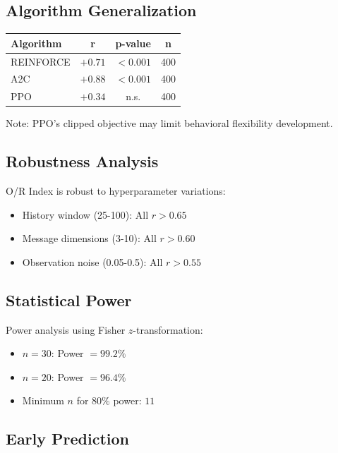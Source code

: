 \documentclass[twoside]{article}
\begin{document}
\subsection{Algorithm Generalization}

\begin{center}
\begin{tabular}{lccc}
\toprule
\textbf{Algorithm} & \textbf{r} & \textbf{p-value} & \textbf{n} \\
\midrule
REINFORCE & $+0.71$ & $< 0.001$ & 400 \\
A2C & $+0.88$ & $< 0.001$ & 400 \\
PPO & $+0.34$ & n.s. & 400 \\
\bottomrule
\end{tabular}
\end{center}

Note: PPO's clipped objective may limit behavioral flexibility development.

\subsection{Robustness Analysis}

O/R Index is robust to hyperparameter variations:

\begin{itemize}
    \item History window (25-100): All $r > 0.65$
    \item Message dimensions (3-10): All $r > 0.60$
    \item Observation noise (0.05-0.5): All $r > 0.55$
\end{itemize}

\subsection{Statistical Power}

Power analysis using Fisher $z$-transformation:

\begin{itemize}
    \item $n = 30$: Power $= 99.2\%$
    \item $n = 20$: Power $= 96.4\%$
    \item Minimum $n$ for $80\%$ power: $11$
\end{itemize}

\subsection{Early Prediction}
\end{document}
